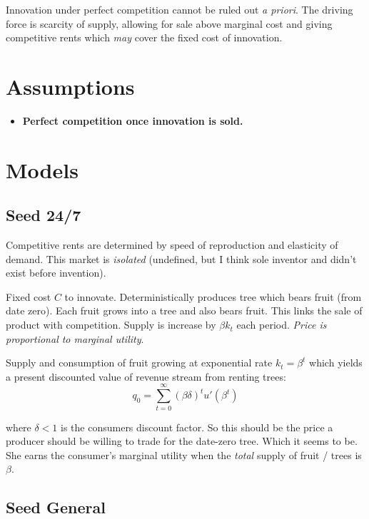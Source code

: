 \documentclass[11pt]{article}
\begin{document}
  Innovation under perfect competition cannot be ruled out \emph{a priori}.  The driving force is scarcity of supply, allowing for sale above marginal cost and giving competitive rents which \emph{may} cover the fixed cost of innovation.
\section{Assumptions}
\label{sec:assumptions}
  \begin{itemize}
    \item \textbf{Perfect competition once innovation is sold.}
  \end{itemize}

\section{Models}
\label{sec:models}
 
\subsection{Seed 24/7}
\label{sub:seed_24_7}

  Competitive rents are determined by speed of reproduction and elasticity of demand.  This market is \emph{isolated} (undefined, but I think sole inventor and didn't exist before invention).  

  Fixed cost $C$ to innovate.  Deterministically produces tree which bears fruit (from date zero).  Each fruit grows into a tree and also bears fruit.  This links the sale of product with competition.  Supply is increase by $\beta k_t$ each period.  \emph{Price is proportional to marginal utility}.

  Supply and consumption of fruit growing at exponential rate $k_t = \beta^t$ which yields a present discounted value of revenue stream from renting trees: 
  \begin{equation} \label{eq:24_7_profit}
    q_0 = \sum_{t=0}^{\infty} (\beta \delta)^t u'(\beta^t)  
  \end{equation}
  
  where $\delta < 1$ is the consumers discount factor.  So this should be the price a producer should be willing to trade for the date-zero tree.  Which it seems to be.  She earns the consumer's marginal utility when the \emph{total} supply of fruit / trees is $\beta$.

\subsection{Seed General}
\label{sub:seed_general}
\end{document}
